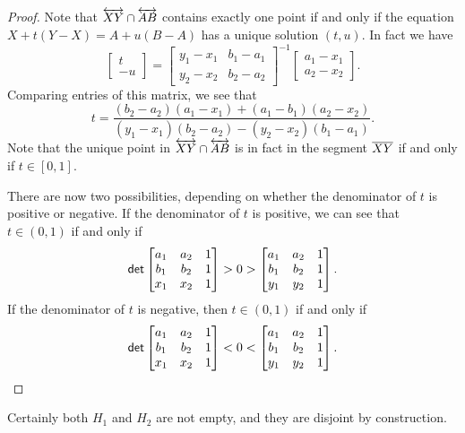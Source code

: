 \begin{proof}
Note that \(\overleftrightarrow{XY} \cap \overleftrightarrow{AB}\) contains exactly one point if and only if the equation \(X + t(Y-X) = A + u(B-A)\) has a unique solution \((t,u)\). In fact we have \[ \begin{bmatrix} t \\ -u \end{bmatrix} = \begin{bmatrix} y_1 - x_1 & b_1 - a_1 \\ y_2 - x_2 & b_2 - a_2 \end{bmatrix}^{-1} \begin{bmatrix} a_1 - x_1 \\ a_2 - x_2 \end{bmatrix}. \] Comparing entries of this matrix, we see that \[ t = \frac{(b_2-a_2)(a_1-x_1) + (a_1-b_1)(a_2-x_2)}{(y_1-x_1)(b_2-a_2) - (y_2-x_2)(b_1-a_1)}. \] Note that the unique point in \(\overleftrightarrow{XY} \cap \overleftrightarrow{AB}\) is in fact in the segment \(\overline{XY}\) if and only if \(t \in [0,1]\).

There are now two possibilities, depending on whether the denominator of \(t\) is positive or negative. If the denominator of \(t\) is positive, we can see that \(t \in (0,1)\) if and only if \[ \mathsf{det} \begin{bmatrix} a_1 & a_2 & 1 \\ b_1 & b_2 & 1 \\ x_1 & x_2 & 1 \end{bmatrix} > 0 > \begin{bmatrix} a_1 & a_2 & 1 \\ b_1 & b_2 & 1 \\ y_1 & y_2 & 1 \end{bmatrix}. \] If the denominator of \(t\) is negative, then \(t \in (0,1)\) if and only if \[ \mathsf{det} \begin{bmatrix} a_1 & a_2 & 1 \\ b_1 & b_2 & 1 \\ x_1 & x_2 & 1 \end{bmatrix} < 0 < \begin{bmatrix} a_1 & a_2 & 1 \\ b_1 & b_2 & 1 \\ y_1 & y_2 & 1 \end{bmatrix}. \qedhere \]
\end{proof}

Certainly both \(H_1\) and \(H_2\) are not empty, and they are disjoint by construction.

